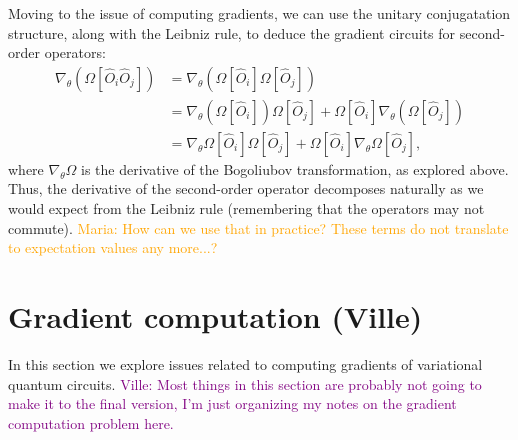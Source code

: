 \documentclass[aps,pra,10pt,twocolumn,groupedaddress,nofootinbib]{revtex4-1}
\theoremstyle{plain}
\newcommand{\maria}[1]{\textcolor{orange}{Maria: #1}}
\newcommand{\ville}[1]{\textcolor{purple}{Ville: #1}}
\begin{document}
Moving to the issue of computing gradients, we can use the unitary conjugatation structure, along with the Leibniz rule, to deduce the gradient circuits for second-order operators:
\begin{align}
 \nabla_\theta\left(\Omega[\hat{O}_i\hat{O}_j] \right)
 & = \nabla_\theta\left(\Omega[\hat{O}_i] \Omega[\hat{O}_j]\right) \nonumber \\
 & = \nabla_\theta\left( \Omega[\hat{O}_i] \right)\Omega[\hat{O}_j] 
 + \Omega[\hat{O}_i]\nabla_\theta \left( \Omega[\hat{O}_j] \right) \nonumber \\
 & = \nabla_\theta\Omega [\hat{O}_i] \Omega[\hat{O}_j] 
 + \Omega[\hat{O}_i]\nabla_\theta \Omega[\hat{O}_j],
\end{align}
where $\nabla_\theta\Omega$ is the derivative of the Bogoliubov transformation, as explored above.
Thus, the derivative of the second-order operator decomposes naturally as we would expect from the Leibniz rule (remembering that the operators may not commute). \maria{How can we use that in practice? These terms do not translate to expectation values any more...?}



\section{Gradient computation (Ville)}

In this section we explore issues related to computing gradients of variational quantum circuits.
\ville{Most things in this section are probably not going to make it to the final version,
I'm just organizing my notes on the gradient computation problem here.}
\end{document}
